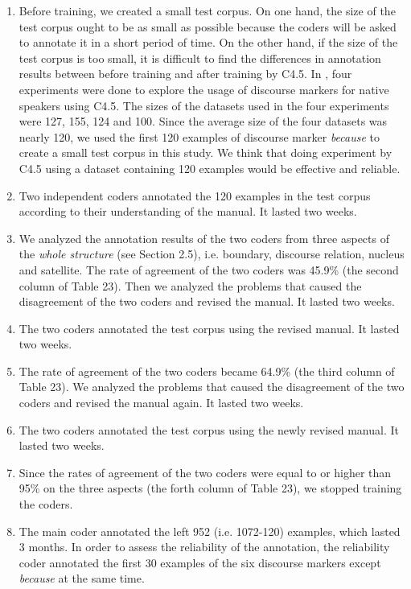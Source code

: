 \documentclass[english]{jnlp_1.3e}
\begin{document}
\begin{enumerate}
  \item Before training, we created a small test corpus. On one hand, the size of the 
test corpus ought to be as small as possible because the coders will be asked to annotate 
it in a short period of time. On the other hand, if the size of the
test corpus is too small, it is difficult to find the differences in annotation 
results between before training and after training by C4.5. 
In \cite{Eugenio97}, four experiments were done to explore
the usage of discourse markers for native speakers using C4.5. The sizes of 
the datasets used in the four experiments were 127, 155, 124 and 100. 
Since the average size of the four datasets was nearly 120, we used the 
first 120 examples of discourse marker \textit{because} 
to create a small test corpus in this study. We think that doing experiment by
C4.5 using a dataset containing 120 examples would be effective and reliable. 
  \item Two independent coders annotated the 120 examples in the test
corpus according to their understanding of the manual. It lasted two weeks. 
  \item We analyzed the annotation results of the two coders 
from three aspects of the \textit{whole structure} (see Section 2.5), 
i.e. boundary, discourse relation, nucleus and satellite. 
The rate of agreement of the two coders was 45.9\% (the second column of Table 23). 
Then we analyzed the problems that caused the disagreement of the two 
coders and revised the manual. It lasted two weeks. 
  \item The two coders annotated the test corpus 
using the revised manual. It lasted two weeks. 
  \item The rate of agreement of the two coders became 64.9\% (the third column of Table 23). 
We analyzed the problems that caused the disagreement of the two coders and revised 
the manual again. It lasted two weeks.
  \item The two coders annotated the test corpus using 
the newly revised manual. It lasted two weeks.
  \item Since the rates of agreement of the two coders were equal to or higher 
than 95\% on the three aspects (the forth column of Table 23), we stopped 
training the coders. 
  \item The main coder annotated the left 952 (i.e. 1072-120) examples, 
which lasted 3 months. In order to assess the reliability of the annotation, 
the reliability coder annotated the first 30 examples of the six discourse 
markers except \textit{because} at the same time.
\end{enumerate}
\end{document}
